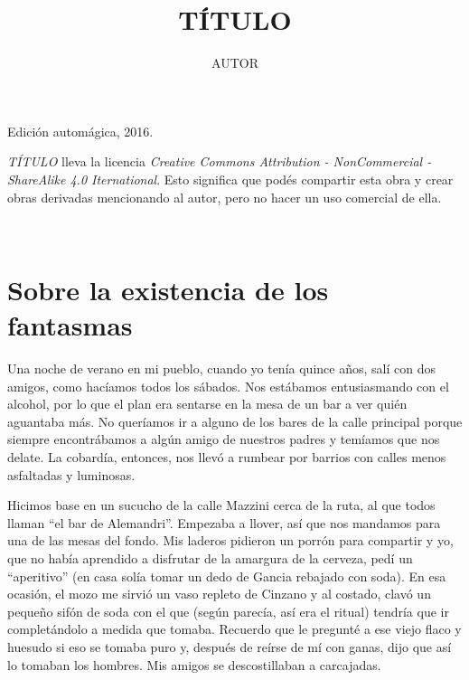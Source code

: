 \documentclass[11pt,twoside,openright]{book}
\title{TÍTULO}
\author{AUTOR}
\date{}
\begin{document}

\pagestyle{plain}


%
%

\maketitle

\cleardoublepage

\thispagestyle{empty}
\noindent
Edición automágica, 2016.\\

\vspace{0.5cm}

\noindent
\emph{TÍTULO} lleva la licencia
\emph{Creative Commons Attribution - NonCommercial - ShareAlike 4.0 Iternational}.
Esto significa que podés compartir esta obra y crear obras derivadas
mencionando al autor, pero no ha\-cer un uso comercial de ella.

\vfill

\noindent
\\

\cleardoublepage









\chapter*{Sobre la existencia de los fantasmas} 





Una noche de verano en mi pueblo, cuando yo tenía quince años, salí con dos amigos, como hacíamos todos los sábados. Nos estábamos entusiasmando con el alcohol, por lo que el plan era sentarse en la mesa de un bar a ver quién aguantaba más. No queríamos ir a alguno de los bares de la calle principal porque siempre encontrábamos a algún amigo de nuestros padres y temíamos que nos delate. La cobardía, entonces, nos llevó a rumbear por barrios con calles menos asfaltadas y luminosas.

Hicimos base en un sucucho de la calle Mazzini cerca de la ruta, al que todos llaman “el bar de Alemandri”. Empezaba a llover, así que nos mandamos para una de las mesas del fondo. Mis laderos pidieron un porrón para compartir y yo, que no había aprendido a disfrutar de la amargura de la cerveza, pedí un “aperitivo” (en casa solía tomar un dedo de Gancia rebajado con soda). En esa ocasión, el mozo me sirvió un vaso repleto de Cinzano y al costado, clavó un pequeño sifón de soda con el que (según parecía, así era el ritual) tendría que ir completándolo a medida que tomaba. Recuerdo que le pregunté a ese viejo flaco y huesudo si eso se tomaba puro y, después de reírse de mí con ganas, dijo que así lo tomaban los hombres. Mis amigos se descostillaban a carcajadas.
\end{document}
